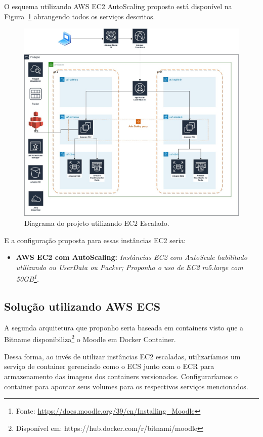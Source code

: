 \documentclass{article}
\begin{document}
O esquema utilizando AWS EC2 AutoScaling proposto está disponível na Figura~\ref{fig:ec2} abrangendo todos os serviços descritos.
\newpage
\begin{figure}[h!]
\centering
\includegraphics[scale=0.3]{ec2}
\caption{Diagrama do projeto utilizando EC2 Escalado.}
\label{fig:ec2}
\end{figure}

E a configuração proposta para essas instâncias EC2 seria:

\begin{itemize}
    \item \textbf{AWS EC2 com AutoScaling:} \textit{Instâncias EC2 com AutoScale habilitado utilizando ou UserData ou Packer; Proponho o uso de EC2 m5.large com 50GB\footnote{Fonte: \url{https://docs.moodle.org/39/en/Installing_Moodle}}.}
\end{itemize}

\subsection{Solução utilizando AWS ECS}

A segunda arquitetura que proponho seria baseada em containers visto que a Bitname disponibiliza\footnote{Disponível em: https://hub.docker.com/r/bitnami/moodle} o Moodle em Docker Container.

Dessa forma, ao invés de utilizar instâncias EC2 escaladas, utilizaríamos um serviço de container gerenciado como o ECS junto com o ECR para armazenamento das imagens dos containers versionados.
Configuraríamos o container para apontar seus volumes para os respectivos serviços mencionados.
\end{document}
